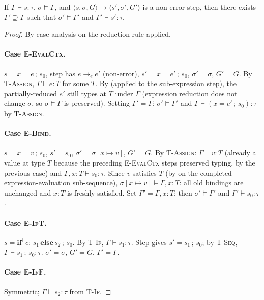 \begin{theorem}[Preservation]\label{thm:preservation}
If $\Gamma\vdash s:\tau$, $\sigma\models\Gamma$, and
$\langle s,\sigma,G\rangle\to\langle s',\sigma',G'\rangle$
is a non-error step,
then there exists $\Gamma'\supseteq\Gamma$ such that
$\sigma'\models\Gamma'$ and $\Gamma'\vdash s':\tau$.
\end{theorem}
\begin{proof}
By case analysis on the reduction rule applied.

\paragraph{Case \textsc{E-EvalCtx}.}
$s = x=e\,;\,s_0$, step has $e\to_e e'$ (non-error),
$s'=x=e'\,;\,s_0$, $\sigma'=\sigma$, $G'=G$.
By \textsc{T-Assign}, $\Gamma\vdash e:T$ for some $T$.
By  (applied to the sub-expression step),
the partially-reduced $e'$ still types at $T$ under $\Gamma$
(expression reduction does not change $\sigma$, so $\sigma\models\Gamma$ is
preserved).
Setting $\Gamma'=\Gamma$: $\sigma'\models\Gamma'$ and
$\Gamma\vdash(x=e'\,;\,s_0):\tau$ by \textsc{T-Assign}.

\paragraph{Case \textsc{E-Bind}.}
$s=x=v\,;\,s_0$, $s'=s_0$, $\sigma'=\sigma[x\mapsto v]$, $G'=G$.
By \textsc{T-Assign}: $\Gamma\vdash v:T$ (already a value at type $T$
because the preceding \textsc{E-EvalCtx} steps preserved typing, by the
previous case) and $\Gamma,x{:}T\vdash s_0:\tau$.
Since $v$ satisfies $T$ (by  on the completed
expression-evaluation sub-sequence), $\sigma[x\mapsto v]\models\Gamma,x{:}T$:
all old bindings are unchanged and $x{:}T$ is freshly satisfied.
Set $\Gamma'=\Gamma,x{:}T$; then $\sigma'\models\Gamma'$ and
$\Gamma'\vdash s_0:\tau$.

\paragraph{Case \textsc{E-IfT}.}
$s=\mathbf{if}^\dagger\,c:\,s_1\,\mathbf{else}\,s_2\,;\,s_0$.
By \textsc{T-If}, $\Gamma\vdash s_1:\tau$.
Step gives $s'=s_1\,;\,s_0$; by \textsc{T-Seq},
$\Gamma\vdash s_1\,;\,s_0:\tau$.
$\sigma'=\sigma$, $G'=G$, $\Gamma'=\Gamma$.

\paragraph{Case \textsc{E-IfF}.}
Symmetric; $\Gamma\vdash s_2:\tau$ from \textsc{T-If}.


\end{proof}
